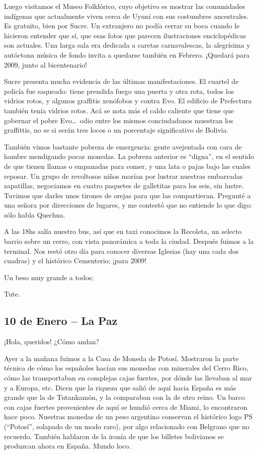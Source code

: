 Luego visitamos el Museo Folklórico, cuyo objetivo es mostrar las comunidades
indígenas que actualmente viven cerca de Uyuni con sus costumbres ancestrales.
Es gratuito, bien por Sucre. Un extranjero no podía cerrar su boca cuando le
hicieron entender que sí, que esas fotos que parecen ilustraciones
enciclopédicas son actuales. Una larga sala era dedicada a caretas
carnavalescas, la alegrísima y autóctona música de fondo invita a quedarse
también en Febrero. ¡Quedará para 2009, junto al bicentenario!

Sucre presenta mucha evidencia de las últimas manifestaciones. El cuartel de
policía fue saqueado: tiene prendida fuego una puerta y otra rota, todos los
vidrios rotos, y algunos graffitis xenófobos y contra Evo. El edificio de
Prefectura también tenía vidrios rotos. Acá se nota más el caldo caliente
que tiene que gobernar el pobre Evo\ldots\ odio entre los mismos conciudadanos
muestran los graffittis, no se si serán tres locos o un porcentaje
significativo de Bolivia.

También vimos bastante pobreza de emergencia: gente avejentada con cara de
hambre mendigando pocas monedas. La pobreza anterior es ``digna'', en el sentido
de que tienen llamas o empanadas para comer, y una lata o pajas bajo las cuales
reposar. Un grupo de revoltosos niños morían por lustrar nuestras embarradas
zapatillas, negociamos en cuatro paquetes de galletitas para los seis, sin
lustre. Tuvimos que darles unos tirones de orejas para que las compartieran.
Pregunté a una señora por direcciones de lugares, y me contestó que no
entiende lo que digo: sólo habla Quechua.

A las 18hs salía nuestro bus, así que en taxi conocimos la Recoleta, un
selecto barrio sobre un cerro, con vista panorámica a toda la ciudad. Después
fuimos a la terminal. Nos restó otro día para conocer diversas Iglesias (hay
una cada dos cuadras) y el histórico Cementerio; ¡para 2009!

Un beso muy grande a todos;

Tute.

\subsection*{10 de Enero -- La Paz}

¡Hola, queridos! ¿Cómo andan?

Ayer a la mañana fuimos a la Casa de Moneda de Potosí. Mostraron la parte
técnica de cómo los españoles hacían sus monedas con minerales del Cerro
Rico, cómo las transportaban en complejas cajas fuertes, por dónde las
llevaban al mar y a Europa, etc. Dicen que la riqueza que salió de aquí hacia
España es más grande que la de Tutankamón, y la comparaban con la de otro
reino. Un barco con cajas fuertes provenientes de aquí se hundió cerca de
Miami, lo encontraron hace poco. Nuestras monedas de un peso argentino conservan
el histórico logo PS (``Potosí'', solapado de un modo raro), por algo
relacionado con Belgrano que no recuerdo. También hablaron de la ironía de que
los billetes bolivianos se produzcan ahora en España. Mundo loco.


